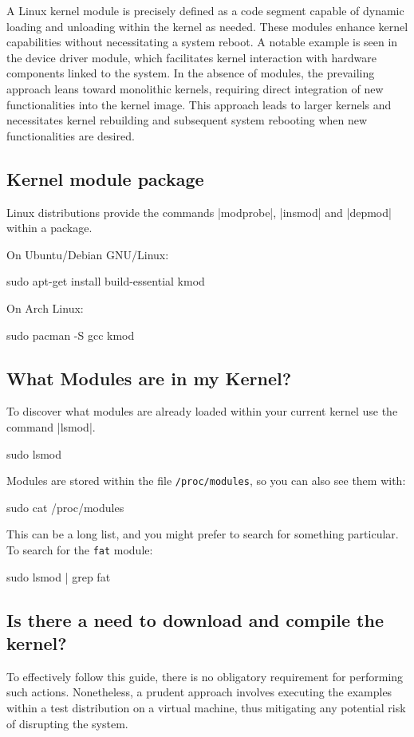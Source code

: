 \documentclass[10pt, oneside]{book}
\begin{document}
A Linux kernel module is precisely defined as a code segment capable of dynamic loading and unloading within the kernel as needed.
These modules enhance kernel capabilities without necessitating a system reboot.
A notable example is seen in the device driver module, which facilitates kernel interaction with hardware components linked to the system.
In the absence of modules, the prevailing approach leans toward monolithic kernels,
requiring direct integration of new functionalities into the kernel image.
This approach leads to larger kernels and necessitates kernel rebuilding and subsequent system rebooting when new functionalities are desired.

\subsection{Kernel module package}
\label{sec:packages}

Linux distributions provide the commands \sh|modprobe|, \sh|insmod| and \sh|depmod| within a package.

On Ubuntu/Debian GNU/Linux:
\begin{codebash}
sudo apt-get install build-essential kmod
\end{codebash}

On Arch Linux:
\begin{codebash}
sudo pacman -S gcc kmod
\end{codebash}

\subsection{What Modules are in my Kernel?}
\label{sec:modutils}

To discover what modules are already loaded within your current kernel use the command \sh|lsmod|.
\begin{codebash}
sudo lsmod
\end{codebash}

Modules are stored within the file \verb|/proc/modules|, so you can also see them with:
\begin{codebash}
sudo cat /proc/modules
\end{codebash}

This can be a long list, and you might prefer to search for something particular.
To search for the \verb|fat| module:
\begin{codebash}
sudo lsmod | grep fat
\end{codebash}

\subsection{Is there a need to download and compile the kernel?}
\label{sec:buildkernel}
To effectively follow this guide, there is no obligatory requirement for performing such actions.
Nonetheless, a prudent approach involves executing the examples within a test distribution on a virtual machine,
thus mitigating any potential risk of disrupting the system.
\end{document}

